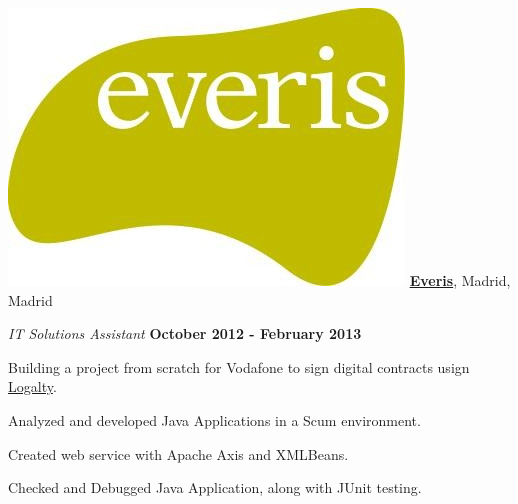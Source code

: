 \includegraphics[scale=0.1]{companies/everis} \href{https://www.everis.es/}{\textbf{Everis}},
Madrid, Madrid
\begin{outerlist}

\item[] \textit{IT Solutions Assistant}%
        \hfill \textbf{October 2012 - February 2013}
\begin{innerlist}
\item Building a project from scratch for Vodafone to sign digital contracts usign \href{https://logalty.com/en/}{Logalty}.
\item Analyzed and developed Java Applications in a Scum environment.
\item Created web service with Apache Axis and XMLBeans.
\item Checked and Debugged Java Application, along with JUnit testing.
\end{innerlist}%
\end{outerlist}


